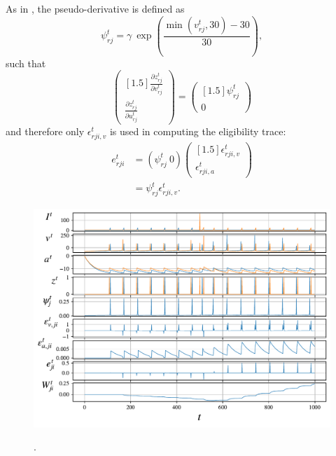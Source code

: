 	        As in \cite{traub2020learning}, the pseudo-derivative is defined as
	        \begin{equation}
	        \psi^t_{rj} = \gamma\ \exp\left(\frac{\min\left(v^t_{rj}, 30\right) - 30}{30}\right),
	        \end{equation}
	        such that
	        \begin{equation}
	        \begin{pmatrix}[1.5]\frac{\partial z^t_{rj}}{\partial v^t_{rj}}\\\frac{\partial z^t_{rj}}{\partial u^t_{rj}}\end{pmatrix}
	        = \begin{pmatrix}[1.5]\psi^t_{rj}\\0\end{pmatrix}
	        \end{equation}
	        and therefore only $\epsilon^t_{rji, v}$ is used in computing the eligibility trace:
	        \begin{align}
	        e^t_{rji} &= \left(\psi^t_{rj}\ 0\right)\begin{pmatrix}[1.5]\epsilon^t_{rji, v}\\\epsilon^t_{rji, a}\end{pmatrix} \\
	        &= \psi^t_{rj}\epsilon^t_{rji, v}.
	        \end{align}

        \begin{figure}[ht]
            \centering
            \includegraphics[width=\linewidth]{gfx/demo_izh}
            \label{fig:demo_izh}
            \caption{.}
        \end{figure}



